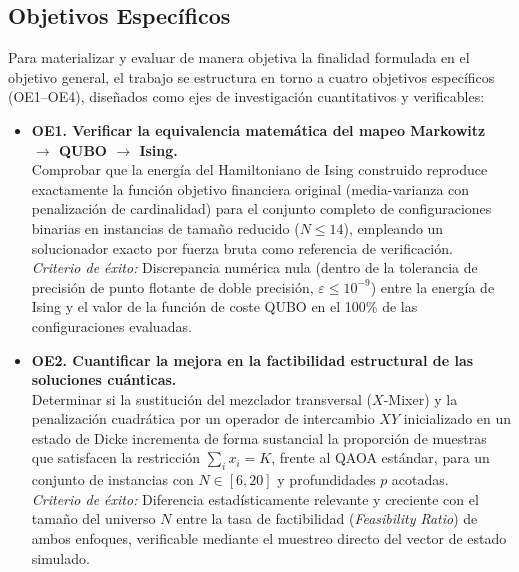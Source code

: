 \subsection{Objetivos Específicos}
\label{subsec:objetivos_especificos}

Para materializar y evaluar de manera objetiva la finalidad formulada en el objetivo general, el trabajo se estructura en torno a cuatro objetivos específicos (OE1--OE4), diseñados como ejes de investigación cuantitativos y verificables:

\begin{itemize}
    \item \textbf{OE1. Verificar la equivalencia matemática del mapeo Markowitz $\rightarrow$ QUBO $\rightarrow$ Ising.} \\
    Comprobar que la energía del Hamiltoniano de Ising construido reproduce exactamente la función objetivo financiera original (media-varianza con penalización de cardinalidad) para el conjunto completo de configuraciones binarias en instancias de tamaño reducido ($N \le 14$), empleando un solucionador exacto por fuerza bruta como referencia de verificación. \\
    \textit{Criterio de éxito:} Discrepancia numérica nula (dentro de la tolerancia de precisión de punto flotante de doble precisión, $\varepsilon \le 10^{-9}$) entre la energía de Ising y el valor de la función de coste QUBO en el 100\% de las configuraciones evaluadas.

    \item \textbf{OE2. Cuantificar la mejora en la factibilidad estructural de las soluciones cuánticas.} \\
    Determinar si la sustitución del mezclador transversal ($X$-Mixer) y la penalización cuadrática por un operador de intercambio $XY$ inicializado en un estado de Dicke incrementa de forma sustancial la proporción de muestras que satisfacen la restricción $\sum_i x_i = K$, frente al QAOA estándar, para un conjunto de instancias con $N \in [6, 20]$ y profundidades $p$ acotadas. \\
    \textit{Criterio de éxito:} Diferencia estadísticamente relevante y creciente con el tamaño del universo $N$ entre la tasa de factibilidad (\textit{Feasibility Ratio}) de ambos enfoques, verificable mediante el muestreo directo del vector de estado simulado.


\end{itemize}
